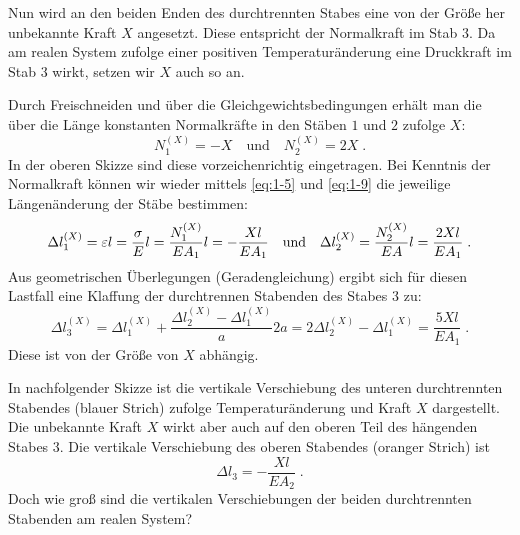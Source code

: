 \begin{example}
    Nun wird an den beiden Enden des durchtrennten Stabes eine von der Größe her unbekannte Kraft $X$ angesetzt.
    Diese entspricht der Normalkraft im Stab $3$.
    Da am realen System zufolge einer positiven Temperaturänderung eine Druckkraft im Stab $3$ wirkt, setzen wir $X$ auch so an.
    \begin{center}
    	
    \end{center}
	Durch Freischneiden und über die Gleichgewichtsbedingungen erhält man die über die Länge konstanten Normalkräfte in den Stäben $1$ und $2$ zufolge $X$:
	\begin{equation}
	N_1^{(X)} = -X \quad \text{und} \quad N_2^{(X)} = 2X\; .
	\end{equation}
	In der oberen Skizze sind diese vorzeichenrichtig eingetragen. Bei Kenntnis der Normalkraft können wir wieder mittels \eqref{eq:1-5} und \eqref{eq:1-9} die jeweilige Längenänderung der Stäbe bestimmen:
	\begin{equation}
	 	\Delta l_1^{(X)}= \varepsilon l = \dfrac{\sigma}{E}l = \dfrac{N_1^{(X)}}{EA_1}l = -\dfrac{Xl}{EA_1}
	 	\quad \text{und} \quad 
	 	\Delta l_2^{(X)}= \dfrac{N_2^{(X)}}{EA}l = \dfrac{2Xl}{EA_1} \; .
	\end{equation}
	Aus geometrischen Überlegungen (Geradengleichung) ergibt sich für diesen Lastfall eine Klaffung der durchtrennen Stabenden des Stabes $3$ zu:
	\begin{equation}
	\Delta l_3^{(X)}=\Delta l_1^{(X)} +\dfrac{\Delta l_2^{(X)}-\Delta l_1^{(X)}}{a}2a = 2\Delta l_2^{(X)}-\Delta l_1^{(X)} = \dfrac{5Xl}{EA_1} \; .
	\end{equation}
	Diese ist von der Größe von $X$ abhängig.
	\begin{center}
		
	\end{center}
	In nachfolgender Skizze ist die vertikale Verschiebung des unteren durchtrennten Stabendes (blauer Strich) zufolge Temperaturänderung und Kraft $X$ dargestellt.
	Die unbekannte Kraft $X$ wirkt aber auch auf den oberen Teil des hängenden Stabes $3$.
	Die vertikale Verschiebung des oberen Stabendes (oranger Strich) ist 
	\begin{equation}
	\Delta l_3 = -\dfrac{Xl}{EA_2} \; .
	\end{equation}
	Doch wie groß sind die vertikalen Verschiebungen der beiden durchtrennten Stabenden am realen System?
	\begin{center}
		
	\end{center}

\end{example}
